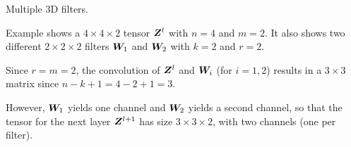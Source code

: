 \begin{frame}{Multiple 3D filters.}

Example shows a $4 \times 4 \times
    2$ tensor ${\boldsymbol Z}^l$ with $n=4$ and $m=2$. It also shows two different $2
    \times 2 \times 2$ 
    filters ${\boldsymbol W}_1$ and ${\boldsymbol W}_2$ with $k=2$ and $r=2$. 

\medskip

Since $r=m=2$, the
    convolution of ${\boldsymbol Z}^l$ and ${\boldsymbol W}_i$ (for $i=1,2$) results in a $3
    \times 3$ matrix since $n-k+1 = 4-2+1 = 3$. 

\medskip

However, ${\boldsymbol W}_1$ yields
    one channel and ${\boldsymbol W}_2$ yields a second channel, so that the tensor
    for the next layer ${\boldsymbol Z}^{l+1}$ has size $3 \times 3 \times 2$, with two
    channels (one per filter).

	\medskip


\end{frame}
